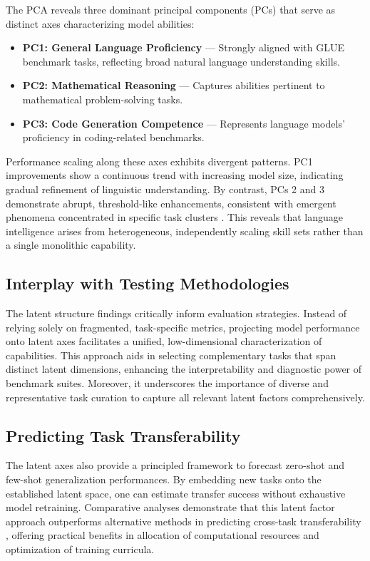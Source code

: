 \documentclass[sigconf]{acmart}
\begin{document}
The PCA reveals three dominant principal components (PCs) that serve as distinct axes characterizing model abilities:
\begin{itemize}
    \item \textbf{PC1: General Language Proficiency} — Strongly aligned with GLUE benchmark tasks, reflecting broad natural language understanding skills.
    \item \textbf{PC2: Mathematical Reasoning} — Captures abilities pertinent to mathematical problem-solving tasks.
    \item \textbf{PC3: Code Generation Competence} — Represents language models’ proficiency in coding-related benchmarks.
\end{itemize}

Performance scaling along these axes exhibits divergent patterns. PC1 improvements show a continuous trend with increasing model size, indicating gradual refinement of linguistic understanding. By contrast, PCs 2 and 3 demonstrate abrupt, threshold-like enhancements, consistent with emergent phenomena concentrated in specific task clusters \cite{ref45}. This reveals that language intelligence arises from heterogeneous, independently scaling skill sets rather than a single monolithic capability.

\subsection{Interplay with Testing Methodologies}

The latent structure findings critically inform evaluation strategies. Instead of relying solely on fragmented, task-specific metrics, projecting model performance onto latent axes facilitates a unified, low-dimensional characterization of capabilities. This approach aids in selecting complementary tasks that span distinct latent dimensions, enhancing the interpretability and diagnostic power of benchmark suites. Moreover, it underscores the importance of diverse and representative task curation to capture all relevant latent factors comprehensively.

\subsection{Predicting Task Transferability}

The latent axes also provide a principled framework to forecast zero-shot and few-shot generalization performances. By embedding new tasks onto the established latent space, one can estimate transfer success without exhaustive model retraining. Comparative analyses demonstrate that this latent factor approach outperforms alternative methods in predicting cross-task transferability \cite{ref45}, offering practical benefits in allocation of computational resources and optimization of training curricula.
\end{document}
